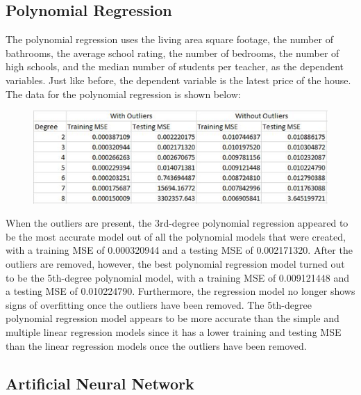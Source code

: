 \documentclass[a4paper]{article}
\begin{document}
	\subsection{Polynomial Regression}
	
	The polynomial regression uses the living area square footage, the number of bathrooms, the average school rating, the number of bedrooms, the number of high schools, and the median number of students per teacher, as the dependent variables. Just like before, the dependent variable is the latest price of the house. The data for the polynomial regression is shown below:
	
	\begin{figure}[H]
		\label{fig:fig4}
		\includegraphics[width=1\linewidth]{fig4}
	\end{figure}
	
	When the outliers are present, the 3rd-degree polynomial regression appeared to be the most accurate model out of all the polynomial models that were created, with a training MSE of 0.000320944 and a testing MSE of 0.002171320. After the outliers are removed, however, the best polynomial regression model turned out to be the 5th-degree polynomial model, with a training MSE of 0.009121448 and a testing MSE of 0.010224790. Furthermore, the regression model no longer shows signs of overfitting once the outliers have been removed. The 5th-degree polynomial regression model appears to be more accurate than the simple and multiple linear regression models since it has a lower training and testing MSE than the linear regression models once the outliers have been removed.
	
	
	\subsection{Artificial Neural Network}
	
\end{document}
